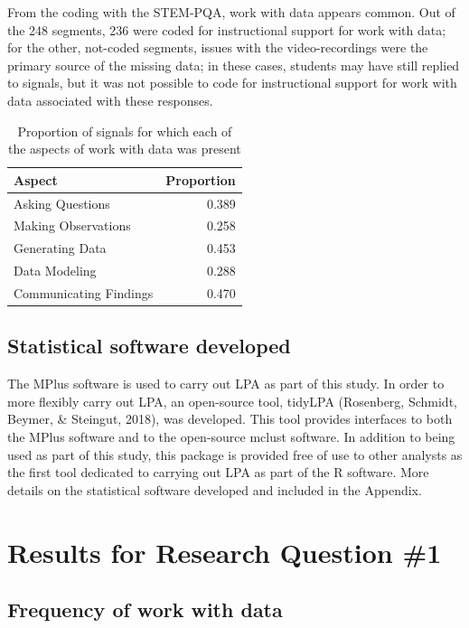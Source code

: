 \documentclass[]{msu-thesis}
\theoremstyle{definition}
\theoremstyle{definition}
\theoremstyle{definition}
\theoremstyle{remark}
\begin{document}
From the coding with the STEM-PQA, work with data appears common. Out of
the 248 segments, 236 were coded for instructional support for work with
data; for the other, not-coded segments, issues with the
video-recordings were the primary source of the missing data; in these
cases, students may have still replied to signals, but it was not
possible to code for instructional support for work with data associated
with these responses.

\begin{table}

\caption{\label{tab:unnamed-chunk-11}Proportion of signals for which each of the aspects of work with data was present}
\centering
\begin{tabular}[t]{lr}
\toprule
Aspect & Proportion\\
\midrule
Asking Questions & 0.389\\
Making Observations & 0.258\\
Generating Data & 0.453\\
Data Modeling & 0.288\\
Communicating Findings & 0.470\\
\bottomrule
\end{tabular}
\end{table}

\section{Statistical software
developed}\label{statistical-software-developed}

The MPlus software is used to carry out LPA as part of this study. In
order to more flexibly carry out LPA, an open-source tool, tidyLPA
(Rosenberg, Schmidt, Beymer, \& Steingut, 2018), was developed. This
tool provides interfaces to both the MPlus software and to the
open-source mclust software. In addition to being used as part of this
study, this package is provided free of use to other analysts as the
first tool dedicated to carrying out LPA as part of the R software. More
details on the statistical software developed and included in the
Appendix.

\chapter{Results for Research Question
\#1}\label{results-for-research-question-1}

\section{Frequency of work with data}\label{frequency-of-work-with-data}
\end{document}
